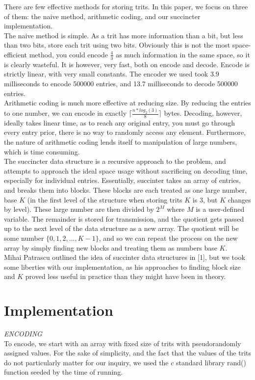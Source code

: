 \documentclass{article}
\begin{document}
\indent There are few effective methods for storing trits. In this paper, we focus on three of them: the naive method, arithmetic coding, and our succincter implementation.\\
\indent The naive method is simple. As a trit has more information than a bit, but less than two bits, store each trit using two bits. Obviously this is not the most space-efficient method, you could encode $\frac{4}{3}$ as much information in the same space, so it is clearly wasteful. It is however, very fast, both on encode and decode. Encode is strictly linear, with very small constants. The encoder we used took 3.9 milliseconds to encode 500000 entries, and 13.7 milliseconds to decode 500000 entries.\\
\indent Arithmetic coding is much more effective at reducing size. By reducing the entries to one number, we can encode in exactly $\lceil \frac{n*log_2(3)}{8}\rceil$ bytes. Decoding, however, ideally takes linear time, as to reach any original entry, you must go through every entry prior, there is no way to randomly access any element. Furthermore, the nature of arithmetic coding lends itself to manipulation of large numbers, which is time consuming.\\
\indent The succincter data structure is a recursive approach to the problem, and attempts to approach the ideal space usage without sacrificing on decoding time, especially for individual entries. Essentially, succinter takes an array of entries, and breaks them into blocks. These blocks are each treated as one large number, base $K$ (in the first level of the structure when storing trits $K$ is 3, but $K$ changes by level). These large number are then divided by $2^M$ where $M$ is a user-defined variable. The remainder is stored for transmission, and the quotient gets passed up to the next level of the data structure as a new array. The quotient will be some number $\{0 , 1, 2, ... , K -1\}$, and so we can repeat the process on the new array by simply finding new blocks and treating them as numbers base $K$.\\
\indent Mihai Patrascu outlined the idea of succinter data structures in [1], but we took some liberties with our implementation, as his approaches to finding block size and $K$ proved less useful in practice than they might have been in theory.

\noindent \section{Implementation}
\emph{ENCODING}\\
To encode, we start with an array with fixed size of trits with pseudorandomly assigned values. For the sake of simplicity, and the fact that the values of the trits do not particularly matter for our inquiry, we used the $c$ standard library rand() function seeded by the time of running. \\
\end{document}
